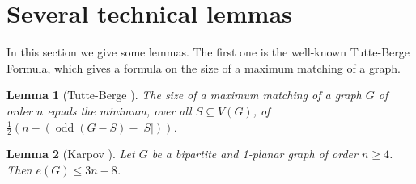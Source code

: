 \documentclass[12pt,a4paper]{article}
\newtheorem{lem}{Lemma}[section]
\DeclareMathOperator{\odd}{odd}
\begin{document}
\section{Several technical lemmas}









In this section we give some lemmas. The first one is the well-known Tutte-Berge Formula, which gives a formula on the size of a maximum matching of a graph. 

\begin{lem}[Tutte-Berge \cite{MR0100850}]\label{lem:tutteberge} 
The size of a maximum matching  of a graph $G$ of order $n$ equals the minimum, over all $S \subseteq V(G)$, of $\frac{1}{2}(n-(\odd(G- S)-|S|))$.
\end{lem} 











\begin{lem}[Karpov \cite{zbMATH06347737}]\label{biparite1_planar}
Let $G$ be a bipartite and 1-planar graph of order $n\ge 4$. Then $e(G)\le 3n-8$.
\end{lem} 

\end{document}
